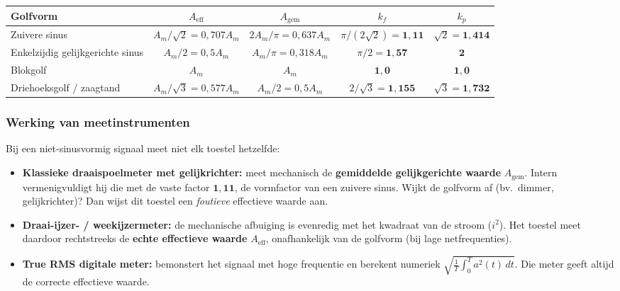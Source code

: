 \documentclass[a4paper,11pt]{article}
\begin{document}
\begin{center}
    \begin{tabular}{@{}lcccc@{}}
        \toprule
        \textbf{Golfvorm}                & $A_{\text{eff}}$          & $A_{\text{gem}}$        & $k_f$                             & $k_p$                       \\
        \midrule
        Zuivere sinus                    & $A_m/\sqrt2 = 0{,}707A_m$ & $2A_m/\pi = 0{,}637A_m$ & $\pi/(2\sqrt2) = \mathbf{1{,}11}$ & $\sqrt2 = \mathbf{1{,}414}$ \\
        Enkelzijdig gelijkgerichte sinus & $A_m/2 = 0{,}5A_m$        & $A_m/\pi = 0{,}318A_m$  & $\pi/2 = \mathbf{1{,}57}$         & $\mathbf{2}$                \\
        Blokgolf                         & $A_m$                     & $A_m$                   & $\mathbf{1{,}0}$                  & $\mathbf{1{,}0}$            \\
        Driehoeksgolf / zaagtand         & $A_m/\sqrt3 = 0{,}577A_m$ & $A_m/2 = 0{,}5A_m$      & $2/\sqrt3 = \mathbf{1{,}155}$     & $\sqrt3 = \mathbf{1{,}732}$ \\
        \bottomrule
    \end{tabular}
\end{center}

\subsubsection{Werking van meetinstrumenten}

Bij een niet-sinusvormig signaal meet niet elk toestel hetzelfde:
\begin{itemize}
    \item \textbf{Klassieke draaispoelmeter met gelijkrichter:} meet mechanisch de \textbf{gemiddelde gelijkgerichte waarde} $A_{\text{gem}}$. Intern vermenigvuldigt hij die met de vaste factor $\mathbf{1{,}11}$, de vormfactor van een zuivere sinus. Wijkt de golfvorm af (bv.\ dimmer, gelijkrichter)? Dan wijst dit toestel een \emph{foutieve} effectieve waarde aan.
    \item \textbf{Draai-ijzer- / weekijzermeter:} de mechanische afbuiging is evenredig met het kwadraat van de stroom ($i^2$). Het toestel meet daardoor rechtstreeks de \textbf{echte effectieve waarde} $A_{\text{eff}}$, onafhankelijk van de golfvorm (bij lage netfrequenties).
    \item \textbf{True RMS digitale meter:} bemonstert het signaal met hoge frequentie en berekent numeriek $\sqrt{\frac{1}{T}\int_0^T a^2(t)\,dt}$. Die meter geeft altijd de correcte effectieve waarde.
\end{itemize}
\end{document}
